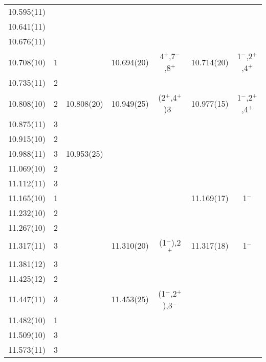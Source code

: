 \begin{center}
\begin{longtable}{cc c cc cc}
  10.595(11)    &       &       &       &       &       &       \\
     10.641(11)     &       &       &       &       &       &       \\
     10.676(11)     &       &       &       &       &       &       \\
     10.708(10)     &   1   &                   &     10.694(20)    &    4$^+$,7$^-$,8$^+$      &    10.714(20)     &    1$^-$,2$^+$,4$^+$      \\
     10.735(11)     &   2   &       &       &       &       &       \\
     10.808(10)     &   2   &     10.808(20)    &     10.949(25)    &     (2$^+$,4$^+$)3$^-$    &   10.977(15)      &    1$^-$,2$^+$,4$^+$      \\
     10.875(11)     &   3   &       &       &       &       &       \\
     10.915(10)     &   2   &       &       &       &       &       \\
   10.988(11)       &   3   &     10.953(25)    &                   &                           &       &       \\
    11.069(10)      &   2   &       &       &       &       &       \\
     11.112(11)     &   3   &       &       &       &       &       \\
    11.165(10)      &   1   &       &       &       &   11.169(17)      &       1$^-$               \\
    11.232(10)      &   2   &       &       &       &       &       \\
    11.267(10)      &   2   &       &       &       &       &       \\
    11.317(11)      &   3   &       &     11.310(20)    &     (1$^-$),2$^+$         &   11.317(18)      &       1$^-$               \\
    11.381(12)      &   3   &       &       &       &       &       \\
    11.425(12)      &   2   &       &       &       &       &       \\
    11.447(11)      &   3   &       &     11.453(25)    &    (1$^-$,2$^+$),3$^-$    &       &       \\
    11.482(10)      &   1   &       &       &       &       &       \\
    11.509(10)      &   3   &       &       &       &       &       \\
     11.573(11)     &   3   &       &       &       &       &       \\

\end{longtable}
\end{center}
